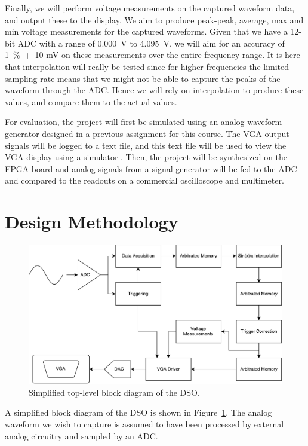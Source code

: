 \documentclass[journal,hidelinks]{IEEEtran}
\begin{document}
Finally, we will perform voltage measurements on the captured waveform data, and output these to the display. We aim to produce peak-peak, average, max and min voltage measurements for the captured waveforms. Given that we have a 12-bit ADC with a range of 0.000~V to 4.095~V, we will aim for an accuracy of 1~\%~+~10 mV on these measurements over the entire frequency range. It is here that interpolation will really be tested since for higher frequencies the limited sampling rate means that we might not be able to capture the peaks of the waveform through the ADC. Hence we will rely on interpolation to produce these values, and compare them to the actual values.

For evaluation, the project will first be simulated using an analog waveform generator designed in a previous assignment for this course. The VGA output signals will be logged to a text file, and this text file will be used to view the VGA display using a simulator \cite{vga_sim}. Then, the project will be synthesized on the FPGA board and analog signals from a signal generator will be fed to the ADC and compared to the readouts on a commercial oscilloscope and multimeter.

\section{Design Methodology}

\begin{figure}[!htb]
  \centering
  \includegraphics[width=\columnwidth]{diagrams/system.pdf}
  \caption{Simplified top-level block diagram of the DSO.}
  \label{fig:system}
\end{figure}

A simplified block diagram of the DSO is shown in Figure~\ref{fig:system}. The analog waveform we wish to capture is assumed to have been processed by external analog circuitry and sampled by an ADC.
\end{document}
